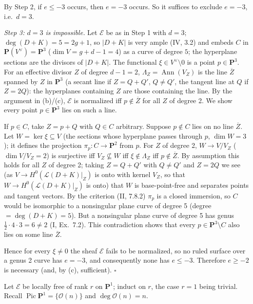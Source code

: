 \documentclass[11pt]{article}
\begin{document}
By Step 2, if $e\le-3$ occurs, then $e=-3$ occurs. So it suffices to exclude $e=-3$, i.e.\ $d=3$.

\emph{Step 3: $d=3$ is impossible.} Let $\mathcal E$ be as in Step 1 with $d=3$; $\deg(D+K)=5=2g+1$, so $|D+K|$ is very ample (IV, 3.2) and embeds $C$ in $\mathbf P(V^\vee)=\mathbf P^3$ ($\dim V=g+d-1=4$) as a curve of degree $5$; the hyperplane sections are the divisors of $|D+K|$. The functional $\xi\in V^\vee\setminus0$ is a point $p\in\mathbf P^3$. For an effective divisor $Z$ of degree $d-1=2$, $\Lambda_Z=\operatorname{Ann}(V_Z)$ is the line $\overline Z$ spanned by $Z$ in $\mathbf P^3$ (a secant line if $Z=Q+Q'$, $Q\ne Q'$, the tangent line at $Q$ if $Z=2Q$): the hyperplanes containing $Z$ are those containing the line. By the argument in (b)/(c), $\mathcal E$ is normalized iff $p\notin\overline Z$ for all $Z$ of degree 2. We show every point $p\in\mathbf P^3$ lies on such a line.

If $p\in C$, take $Z=p+Q$ with $Q\in C$ arbitrary. Suppose $p\notin C$ lies on no line $\overline Z$. Let $W=\ker\xi\subseteq V$ (the sections whose hyperplane passes through $p$, $\dim W=3$); it defines the projection $\pi_p\colon C\to\mathbf P^2$ from $p$. For $Z$ of degree 2, $W\to V/V_Z$ ($\dim V/V_Z=2$) is surjective iff $V_Z\not\subseteq W$ iff $\xi\notin\Lambda_Z$ iff $p\notin\overline Z$. By assumption this holds for all $Z$ of degree 2; taking $Z=Q+Q'$ with $Q\ne Q'$ and $Z=2Q$ we see (as $V\to H^0(\mathcal L(D+K)|_Z)$ is onto with kernel $V_Z$, so that $W\to H^0(\mathcal L(D+K)|_Z)$ is onto) that $W$ is base-point-free and separates points and tangent vectors. By the criterion (II, 7.8.2) $\pi_p$ is a closed immersion, so $C$ would be isomorphic to a nonsingular plane curve of degree 5 (degree $=\deg(D+K)=5$). But a nonsingular plane curve of degree 5 has genus $\frac12\cdot4\cdot3=6\ne2$ (I, Ex.~7.2). This contradiction shows that every $p\in\mathbf P^3\setminus C$ also lies on some line $\overline Z$.

Hence for every $\xi\ne0$ the sheaf $\mathcal E$ fails to be normalized, so no ruled surface over a genus 2 curve has $e=-3$, and consequently none has $e\le-3$. Therefore $e\ge-2$ is necessary (and, by (c), sufficient). \hfill$\square$

\pf
Let $\mathcal E$ be locally free of rank $r$ on $\mathbf P^1$; induct on $r$, the case $r=1$ being trivial. Recall $\operatorname{Pic}\mathbf P^1=\{\mathcal O(n)\}$ and $\deg\mathcal O(n)=n$.
\end{document}
